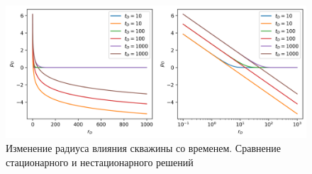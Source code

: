 \documentclass[oneside, openany]{memoir}
\begin{document}
	\begin{figure}[h!]
		\begin{center}
			\includegraphics[width=12cm]{pics/stac_radius_investigation_1.png}
			\caption{Изменение радиуса влияния скважины со временем. Сравнение стационарного и нестационарного решений}
			\label{ris:stac_radius_investigation_1}
		\end{center}
	\end{figure}
	
	
	\printbibliography
\end{document}
